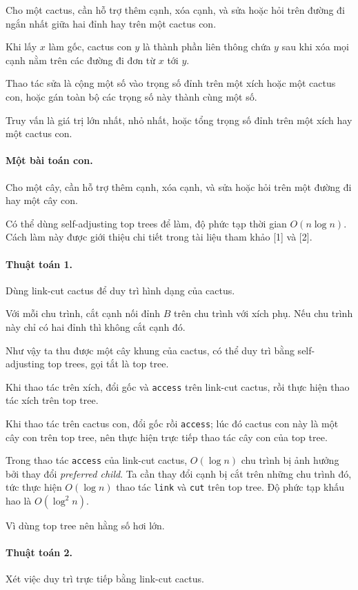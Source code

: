 \documentclass[11pt]{article}
\begin{document}
Cho một cactus, cần hỗ trợ thêm cạnh, xóa cạnh, và sửa hoặc hỏi trên đường đi
ngắn nhất giữa hai đỉnh hay trên một cactus con.

Khi lấy \(x\) làm gốc, cactus con \(y\) là thành phần liên thông chứa \(y\) sau
khi xóa mọi cạnh nằm trên các đường đi đơn từ \(x\) tới \(y\).

Thao tác sửa là cộng một số vào trọng số đỉnh trên một xích hoặc một cactus
con, hoặc gán toàn bộ các trọng số này thành cùng một số.

Truy vấn là giá trị lớn nhất, nhỏ nhất, hoặc tổng trọng số đỉnh trên một xích
hay một cactus con.

\paragraph{Một bài toán con.}
Cho một cây, cần hỗ trợ thêm cạnh, xóa cạnh, và sửa hoặc hỏi trên một đường đi
hay một cây con.

Có thể dùng self-adjusting top trees để làm, độ phức tạp thời gian
\(O(n\log n)\). Cách làm này được giới thiệu chi tiết trong tài liệu tham khảo
[1] và [2].

\paragraph{Thuật toán 1.}
Dùng link-cut cactus để duy trì hình dạng của cactus.

Với mỗi chu trình, cắt cạnh nối đỉnh \(B\) trên chu trình với xích phụ. Nếu chu
trình này chỉ có hai đỉnh thì không cắt cạnh đó.

Như vậy ta thu được một cây khung của cactus, có thể duy trì bằng
self-adjusting top trees, gọi tắt là top tree.

Khi thao tác trên xích, đổi gốc và \texttt{access} trên link-cut cactus, rồi
thực hiện thao tác xích trên top tree.

Khi thao tác trên cactus con, đổi gốc rồi \texttt{access}; lúc đó cactus con
này là một cây con trên top tree, nên thực hiện trực tiếp thao tác cây con của
top tree.

Trong thao tác \texttt{access} của link-cut cactus, \(O(\log n)\) chu trình bị
ảnh hưởng bởi thay đổi \emph{preferred child}. Ta cần thay đổi cạnh bị cắt trên
những chu trình đó, tức thực hiện \(O(\log n)\) thao tác \texttt{link} và
\texttt{cut} trên top tree. Độ phức tạp khấu hao là \(O(\log^2 n)\).

Vì dùng top tree nên hằng số hơi lớn.

\paragraph{Thuật toán 2.}
Xét việc duy trì trực tiếp bằng link-cut cactus.
\end{document}

